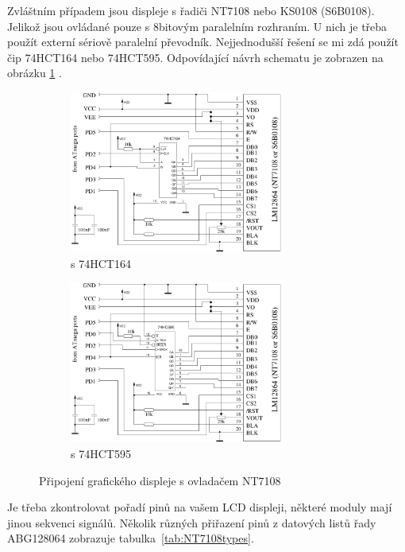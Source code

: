 Zvláštním případem jsou displeje s řadiči NT7108 nebo KS0108 (S6B0108). Jelikož jsou ovládané
pouze s 8bitovým paralelním rozhraním. U nich je třeba použít externí sériově paralelní převodník.
Nejjednodušší řešení se mi zdá použít čip 74HCT164 nebo 74HCT595.
Odpovídající návrh schematu je zobrazen na obrázku \ref{fig:NT7108lcd} .
    	\vspace{-0.3cm} 
\begin{figure}[H]
  \begin{subfigure}[b]{9cm}
    \centering
    \includegraphics[width=7cm]{../FIG/ST7108serial164.pdf}
    	\vspace{-0.2cm} 
    \caption{s 74HCT164}
  \end{subfigure}
  \begin{subfigure}[b]{9cm}
    \centering
    \includegraphics[width=7cm]{../FIG/ST7108serial595.pdf}
    	\vspace{-0.2cm} 
    \caption{s 74HCT595}
  \end{subfigure}
  	\vspace{-0.6cm} 
  \caption{Připojení grafického displeje s ovladačem NT7108}
  \label{fig:NT7108lcd}
\end{figure}
\vspace{-0.6cm} 
Je třeba zkontrolovat pořadí pinů na vašem LCD displeji, některé moduly mají jinou sekvenci signálů.
Několik různých přiřazení pinů z datových listů řady ABG128064 zobrazuje tabulka~\ref{tab:NT7108types}.

